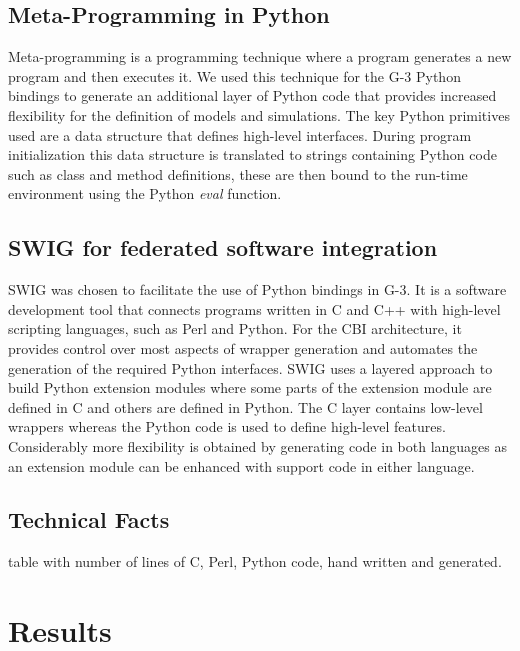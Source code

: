 \documentclass[12pt]{article}
\begin{document}

\subsection{Meta-Programming in Python}

Meta-programming is a programming technique where a program generates
a new program and then executes it.  We used this technique for the G-3
Python bindings to generate an additional layer of Python code that
provides increased flexibility for the definition of models and
simulations.  The key Python primitives used are a data structure that
defines high-level interfaces.  During program initialization this
data structure is translated to strings containing Python code such as
class and method definitions, these are then bound to the run-time
environment using the Python {\it eval} function.

\subsection{SWIG for federated software integration}

SWIG was chosen to facilitate the use of Python bindings in G-3. It is
a software development tool that connects programs written in C and
C++ with high-level scripting languages, such as Perl and Python. For
the CBI architecture, it provides control over most aspects of wrapper
generation and automates the generation of the required Python
interfaces. SWIG uses a layered approach to build Python extension
modules where some parts of the extension module are defined in C and
others are defined in Python. The C layer contains low-level wrappers
whereas the Python code is used to define high-level features.
Considerably more flexibility is obtained by generating code in both
languages as an extension module can be enhanced with support code in
either language.

\subsection{Technical Facts}

table with number of lines of C, Perl, Python code, hand written and
generated.

\section{Results}
\end{document}
